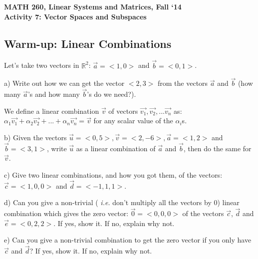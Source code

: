 \documentclass{article}
\begin{document}
\begin{flushleft}
	\bfseries{MATH 260, Linear Systems and Matrices, Fall `14}\\
	\bfseries{Activity 7:  Vector Spaces and Subspaces}\\
\end{flushleft}
\begin{flushleft}

\section*{Warm-up:  Linear Combinations}

Let's take two vectors in $\mathbb{R}^2$: $\vec{a}=<1,0>$ and $\vec{b}=<0,1>$.

\vspace{0.1in}

a) Write out how we can get the vector $<2,3>$ from the vectors $\vec{a}$ and $\vec{b}$ (how many $\vec{a}$'s and how many $\vec{b}$'s do we need?).

\vspace{1.5in}

We define a linear combination $\vec{v}$ of vectors $\vec{v_1}, \vec{v_2}, ... \vec{v_n}$ as: $\alpha_1 \vec{v_1} + \alpha_2 \vec{v_2} + ... + \alpha_n \vec{v_n} = \vec{v}$ for any scalar value of the $\alpha_i$s.

\vspace{0.1in}

b) Given the vectors $\vec{u} = <0,5>, \vec{v} = <2,-6>, \vec{a}=<1,2>$ and $\vec{b}=<3,1>$, write $\vec{u}$ as a linear combination of $\vec{a}$ and $\vec{b}$, then do the same for $\vec{v}$.

\pagebreak
 
c) Give two linear combinations, and how you got them, of the vectors: $\vec{c}=<1,0,0>$ and $\vec{d}=<-1,1,1>$.

\vspace{1in}

d) Can you give a non-trivial (\emph{ i.e.} don't multiply all the vectors by 0) linear combination which gives the zero vector: $\vec{0}=<0,0,0>$ of the vectors $\vec{c}$, $\vec{d}$ and $\vec{e}=<0,2,2>$. If yes, show it. If no, explain why not.

\vspace{1in}

e) Can you give a non-trivial combination to get the zero vector if you only have $\vec{c}$ and $\vec{d}$? If yes, show it. If no, explain why not.


\end{flushleft}
\end{document}
